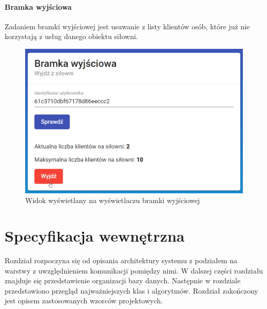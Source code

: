 \documentclass[a4paper,twoside,12pt]{book}
\begin{document}
\subsubsection{Bramka wyjściowa}
Zadaniem bramki wyjściowej jest usuwanie z listy klientów osób, które już nie korzystają z usług danego obiektu siłowni.
\begin{figure}[h!]
	\centering
	\includegraphics[width=1\linewidth]{../zrzuty_ekranu/dzialanie/bramki/bramka_wyjsciowa}
	\caption{Widok wyświetlany na wyświetlaczu bramki wyjściowej}
	\label{fig:bramkawyjsciowa}
\end{figure}
\FloatBarrier

\chapter{Specyfikacja wewnętrzna}
\label{chap:internal}
Rozdział rozpoczyna się od opisania architektury systemu z podziałem na warstwy z uwzględnieniem komunikacji pomiędzy nimi. W dalszej części rozdziału znajduje się przedstawienie organizacji bazy danych. Następnie w rozdziale przedstawiono przegląd najważniejszych klas i algorytmów. Rozdział zakończony jest opisem zastosowanych wzorców projektowych.
\end{document}

